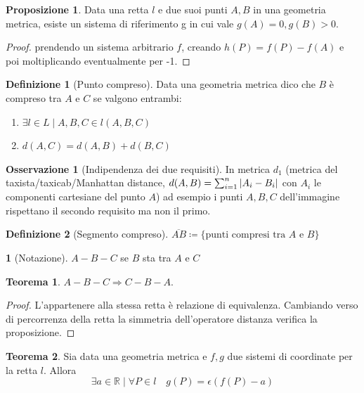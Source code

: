 \documentclass[a4paper,10pt]{article}
\theoremstyle{definition}
\newcommand{\re}{\mathbb{R}} %
\theoremstyle{indentdefinition}
\newtheorem{defn}{Definizione}[section]
\theoremstyle{indentpostulate}
\theoremstyle{indenttheorem}
\newtheorem{thm}{Teorema}[section]
\newtheorem{prop}{Proposizione}[section]
\theoremstyle{myremark}
\newtheorem*{rem*}{Osservazione}
\theoremstyle{indentgeneral}
\newtheorem*{gen}{}
\begin{document}
\begin{prop}
    Data una retta $l$ e due suoi punti $A,B$ in una geometria metrica, esiste un sistema di riferimento g in cui vale $g(A)=0,g(B)>0$.
\end{prop}
\begin{proof}
    prendendo un sistema arbitrario $f$, creando $h(P)=f(P)-f(A)$ e poi moltiplicando eventualmente per -1.
\end{proof}

\begin{defn}[Punto compreso]
    Data una geometria metrica dico che $B$ è compreso tra $A$ e $C$ se valgono entrambi:
\begin{enumerate}
    \item $\exists l \in L \mid A,B,C \in l (A,B,C)$
    \item $d(A,C)=d(A,B)+d(B,C)$
\end{enumerate}

\end{defn} 

\begin{rem*}[Indipendenza dei due requisiti]
    In metrica $d_1$ (metrica del taxista/taxicab/Manhattan distance, $d(A,B)=\sum_{i=1}^n\abs{A_i-B_i}$ con $A_i$ le componenti cartesiane del punto $A$) ad esempio i punti $A,B,C$ dell'immagine rispettano il secondo requisito ma non il primo.
\end{rem*}

\begin{defn}[Segmento compreso]
    $\overline{AB}\coloneqq\{\text{punti compresi tra $A$ e $B$}\}$
\end{defn}

\begin{gen}[Notazione]
    $A-B-C$ se $B$ sta tra $A$ e $C$
\end{gen}

\begin{thm}   $A-B-C \Rightarrow C-B-A$.   \end{thm} 

\begin{proof}   L'appartenere alla stessa retta è relazione di equivalenza. Cambiando verso di percorrenza della retta la simmetria dell'operatore distanza verifica la proposizione.   \end{proof} 



\begin{thm}  Sia data una geometria metrica e $f,g$ due sistemi di coordinate per la retta $l$. Allora $$ \exists a \in \re\mid\forall P \in l\quad g(P)= \epsilon (f(P)-a)$$    \end{thm} 
\end{document}
